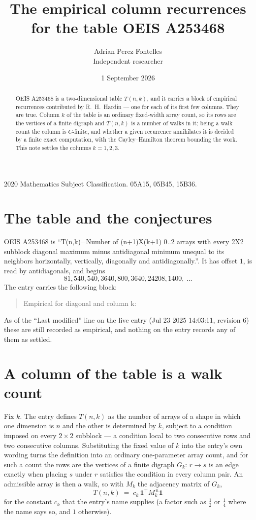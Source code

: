 \documentclass[11pt,a4paper]{article}
\title{The empirical column recurrences for the table OEIS A253468}
\author{Adrian Perez Fontelles\\ \small Independent researcher}
\date{1 September 2026}
\theoremstyle{plain}
\theoremstyle{definition}
\begin{document}
\maketitle

\begin{abstract}
OEIS A253468 is a two-dimensional table $T(n,k)$, and it carries a block of empirical
recurrences contributed by R.~H.~Hardin --- one for each of its first few columns. They are
true. Column $k$ of the table is an ordinary fixed-width array count, so its rows are the
vertices of a finite digraph and $T(n,k)$ is a number of walks in it; being a walk count the
column is $C$-finite, and whether a given recurrence annihilates it is decided by a finite
exact computation, with the Cayley--Hamilton theorem bounding the work. This note settles the columns $k=1, 2, 3$.
\end{abstract}

\noindent\small 2020 Mathematics Subject Classification. 05A15, 05B45, 15B36.\normalsize

\section{The table and the conjectures}

OEIS A253468 is ``T(n,k)=Number of (n+1)X(k+1) 0..2 arrays with every 2X2 subblock diagonal maximum minus antidiagonal minimum unequal to its neighbors horizontally, vertically, diagonally and antidiagonally.''. It has offset $1$, is
read by antidiagonals, and begins
\[
81, 540, 540, 3640, 800, 3640, 24208, 1400,\ \dots
\]
The entry carries the following block:
\begin{quote}\small
Empirical for diagonal and column k:\\
\end{quote}
As of the ``Last modified'' line on the live entry (Jul 23 2025 14:03:11, revision 6) these are still
recorded as empirical, and nothing on the entry records any of them as settled.

\section{A column of the table is a walk count}

Fix $k$. The entry defines $T(n,k)$ as the number of arrays of a shape in which one dimension
is $n$ and the other is determined by $k$, subject to a condition imposed on every
$2\times2$ subblock --- a condition local to two consecutive rows and two consecutive columns.
Substituting the fixed value of $k$ into the entry's own wording turns the definition into an
ordinary one-parameter array count, and for such a count the rows are the vertices of a finite
digraph $G_k$: $r\to s$ is an edge exactly when placing $s$ under $r$ satisfies the condition
in every column pair. An admissible array is then a walk, so with $M_k$ the adjacency matrix
of $G_k$,
\[
T(n,k)\;=\;c_k\,\mathbf{1}^{\!\top}M_k^{\,n}\mathbf{1}
\]
for the constant $c_k$ that the entry's name supplies (a factor such as $\tfrac12$ or
$\tfrac14$ where the name says so, and $1$ otherwise).
\end{document}
